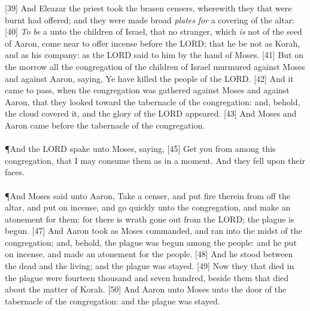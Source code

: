 [39] \textcolor[cmyk]{0.99998,1,0,0}{And Eleazar the priest took the brasen censers, wherewith they that were burnt had offered; and they were made broad \emph{plates} \emph{for} a covering of the altar:}
[40] \textcolor[cmyk]{0.99998,1,0,0}{\emph{To} \emph{be} a  unto the children of Israel, that no stranger, which \emph{is} not of the seed of Aaron, come near to offer incense before the LORD; that he be not as Korah, and as his company: as the LORD said to him by the hand of Moses.}
[41] \textcolor[cmyk]{0.99998,1,0,0}{But on the morrow all the congregation of the children of Israel murmured against Moses and against Aaron, saying, Ye have killed the people of the LORD.}
[42] \textcolor[cmyk]{0.99998,1,0,0}{And it came to pass, when the congregation was gathered against Moses and against Aaron, that they looked toward the tabernacle of the congregation: and, behold, the cloud covered it, and the glory of the LORD appeared.}
[43] \textcolor[cmyk]{0.99998,1,0,0}{And Moses and Aaron came before the tabernacle of the congregation.}\\
\\
\P \textcolor[cmyk]{0.99998,1,0,0}{And the LORD spake unto Moses, saying,}
[45] \textcolor[cmyk]{0.99998,1,0,0}{Get you  from among this congregation, that I may consume them as in a moment. And they fell upon their faces.}\\
\\
\P \textcolor[cmyk]{0.99998,1,0,0}{And Moses said unto Aaron, Take a censer, and put fire therein from off the altar, and put on incense, and go quickly unto the congregation, and make an atonement for them: for there is wrath gone out from the LORD; the plague is begun.}
[47] \textcolor[cmyk]{0.99998,1,0,0}{And Aaron took as Moses commanded, and ran into the midst of the congregation; and, behold, the plague was begun among the people: and he put on incense, and made an atonement for the people.}
[48] \textcolor[cmyk]{0.99998,1,0,0}{And he stood between the dead and the living; and the plague was stayed.}
[49] \textcolor[cmyk]{0.99998,1,0,0}{Now they that died in the plague were fourteen thousand and seven hundred, beside them that died about the matter of Korah.}
[50] \textcolor[cmyk]{0.99998,1,0,0}{And Aaron  unto Moses unto the door of the tabernacle of the congregation: and the plague was stayed.}